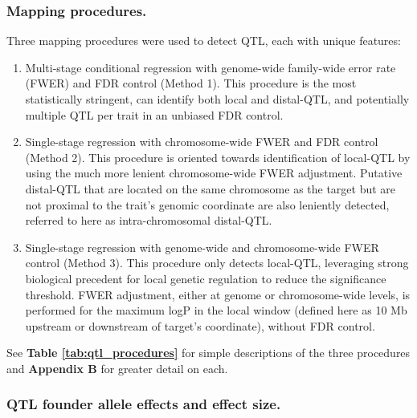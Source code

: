 \documentclass[9pt,twocolumn,twoside]{gsajnl}
\newcommand{\method}[1]{\qquad Method #1}
\begin{document}
\subsubsection{Mapping procedures.} Three mapping procedures were used to detect QTL, each with unique features:
\begin{enumerate}
	\item Multi-stage conditional regression with genome-wide family-wide error rate (FWER) and FDR control (Method 1). This procedure is the most statistically stringent, can identify both local and distal-QTL, and potentially multiple QTL per trait in an unbiased FDR control.
    \item Single-stage regression with chromosome-wide FWER and FDR control (Method 2). This procedure is oriented towards identification of local-QTL by using the much more lenient chromosome-wide FWER adjustment. Putative distal-QTL that are located on the same chromosome as the target but are not proximal to the trait's genomic coordinate are also leniently detected, referred to here as intra-chromosomal distal-QTL.
    \item Single-stage regression with genome-wide and chromosome-wide FWER control (Method 3). This procedure only detects local-QTL, leveraging strong biological precedent for local genetic regulation to reduce the significance threshold. FWER adjustment, either at genome or chromosome-wide levels, is performed for the maximum logP in the local window (defined here as 10 Mb upstream or downstream of target's coordinate), without FDR control.
\end{enumerate}

See \textbf{Table \ref{tab:qtl_procedures}} for simple descriptions of the three procedures and \textbf{Appendix B} for greater detail on each.

\subsubsection{QTL founder allele effects and effect size.} 
\end{document}
